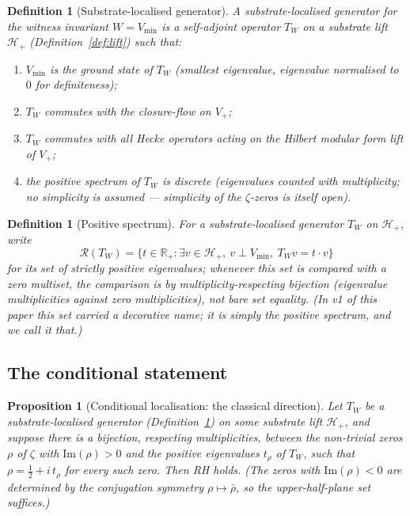 \documentclass[11pt,a4paper]{article}
\newtheorem{proposition}[theorem]{Proposition}
\newtheorem{definition}[theorem]{Definition}
\newcommand{\R}{\mathbb{R}}
\newcommand{\Vmin}{V_{\min}}
\newcommand{\Wit}{W}
\newcommand{\Twit}{T_W}
\begin{document}
\begin{definition}[Substrate-localised generator]
\label{def:spectral-generator}
A \emph{substrate-localised generator} for the witness invariant
$\Wit = \Vmin$ is a self-adjoint operator $\Twit$ on a
substrate lift $\mathcal{H}_+$ (Definition~\ref{def:lift}) such
that:
\begin{enumerate}[leftmargin=*,label=(\roman*)]
  \item $\Vmin$ is the ground state of $\Twit$ (smallest
        eigenvalue, eigenvalue normalised to $0$ for definiteness);
  \item $\Twit$ commutes with the closure-flow on $V_+$;
  \item $\Twit$ commutes with all Hecke operators acting on the
        Hilbert modular form lift of $V_+$;
  \item the positive spectrum of $\Twit$ is discrete (eigenvalues
        counted with multiplicity; no simplicity is assumed ---
        simplicity of the $\zeta$-zeros is itself open).
\end{enumerate}
\end{definition}

\begin{definition}[Positive spectrum]
\label{def:resonance-depth-set}
For a substrate-localised generator $\Twit$ on $\mathcal{H}_+$,
write
\[
\mathcal{R}(\Twit) = \{t \in \R_+ : \exists v \in
\mathcal{H}_+,\ v \perp \Vmin,\ \Twit v = t \cdot v\}
\]
for its set of strictly positive eigenvalues; whenever this set is
compared with a zero multiset, the comparison is by
multiplicity-respecting bijection (eigenvalue multiplicities
against zero multiplicities), not bare set equality. (In v1 of
this paper this set carried a decorative name; it is simply the
positive
spectrum, and we call it that.)
\end{definition}

\subsection{The conditional statement}

\begin{proposition}[Conditional localisation: the classical direction]
\label{thm:witness-resonance}
Let $\Twit$ be a substrate-localised generator
(Definition~\ref{def:spectral-generator}) on some substrate lift
$\mathcal{H}_+$, and suppose there is a bijection, respecting
multiplicities, between the non-trivial zeros $\rho$ of $\zeta$
with $\mathrm{Im}(\rho) > 0$ and the positive eigenvalues
$t_\rho$ of $\Twit$, such that $\rho = \tfrac12 + i\,t_\rho$
for every such zero. Then RH holds. (The zeros with
$\mathrm{Im}(\rho) < 0$ are determined by the conjugation
symmetry $\rho \mapsto \bar\rho$, so the upper-half-plane set
suffices.)
\end{proposition}
\end{document}
